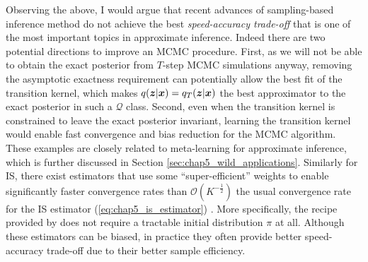 Observing the above, I would argue that recent advances of sampling-based inference method do not achieve the best \emph{speed-accuracy trade-off} that is one of the most important topics in approximate inference. Indeed there are two potential directions to improve an MCMC procedure. First, as we will not be able to obtain the exact posterior from $T$-step MCMC simulations anyway, removing the asymptotic exactness requirement can potentially allow the best fit of the transition kernel, which makes $q(\bm{z} | \bm{x}) = q_{T}(\bm{z} | \bm{x})$ the best approximator to the exact posterior in such a $\mathcal{Q}$ class. Second, even when the transition kernel is constrained to leave the exact posterior invariant, learning the transition kernel would enable fast convergence and bias reduction for the MCMC algorithm.
%
These examples are closely related to meta-learning \citep{schmidhuber:thesis1987, bengio:meta1992, naik:meta1992, thrun:meta1998} for approximate inference, which is further discussed in Section \ref{sec:chap5_wild_applications}.
%
Similarly for IS, there exist estimators that use some ``super-efficient'' weights to enable significantly faster convergence rates than $\mathcal{O}(K^{-\frac{1}{2}})$ the usual convergence rate for the IS estimator (\ref{eq:chap5_is_estimator}) \citep{del:smc2006, liu:bbis2017, ohagan:bayesian_quadrature1991, ghahramani:bayesianMC2003, oates:mc_integration2017}. More specifically, the recipe provided by \cite{liu:bbis2017} does not require a tractable initial distribution $\pi$ at all. Although these estimators can be biased, in practice they often provide better speed-accuracy trade-off due to their better sample efficiency.

